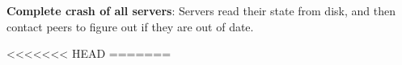 \documentclass[letterpaper,10pt]{article}
\begin{document}
\begin{itemize}
\textbf{Complete crash of all servers}: Servers read their state from
disk, and then contact peers to figure out if they are out of date. 

<<<<<<< HEAD
=======



\end{itemize}
\end{document}
